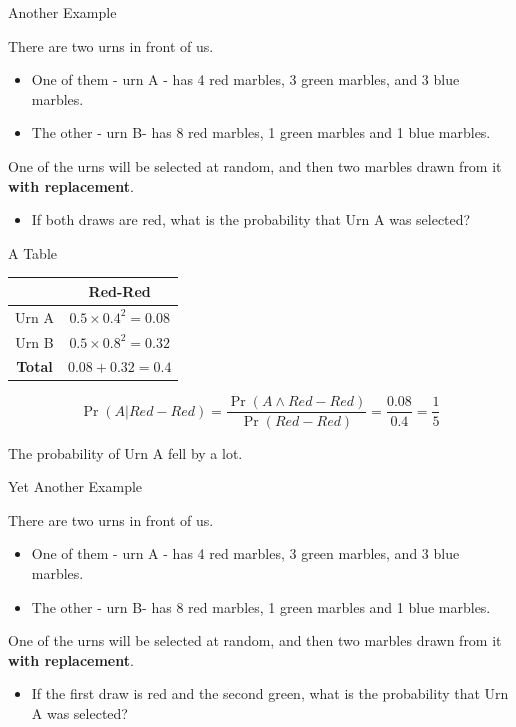\documentclass[
  ignorenonframetext,
]{beamer}
\providecommand{\tightlist}{%
  \setlength{\itemsep}{0pt}\setlength{\parskip}{0pt}}
\renewcommand{\,}{\text{, }}
\begin{document}
\begin{frame}{Another Example}
\protect\hypertarget{another-example-1}{}

There are two urns in front of us.

\begin{itemize}
\tightlist
\item
  One of them - urn A - has 4 red marbles, 3 green marbles, and 3 blue
  marbles.
\item
  The other - urn B- has 8 red marbles, 1 green marbles and 1 blue
  marbles. \pause
\end{itemize}

One of the urns will be selected at random, and then two marbles drawn
from it \textbf{with replacement}.

\begin{itemize}
\tightlist
\item
  If both draws are red, what is the probability that Urn A was
  selected?
\end{itemize}

\end{frame}

\begin{frame}{A Table}
\protect\hypertarget{a-table-1}{}

\begin{longtable}[]{@{}cc@{}}
\toprule
& Red-Red\tabularnewline
\midrule
\endhead
Urn A & \(0.5 \times 0.4^2 = 0.08\)\tabularnewline
Urn B & \(0.5 \times 0.8^2 = 0.32\)\tabularnewline
\textbf{Total} & \(0.08 + 0.32 = 0.4\)\tabularnewline
\bottomrule
\end{longtable}

\pause

\[
\Pr(A | Red-Red) = \frac{\Pr(A \wedge Red-Red)}{\Pr(Red-Red)} = \frac{0.08}{0.4} = \frac{1}{5}
\]

The probability of Urn A fell by a lot.

\end{frame}

\begin{frame}{Yet Another Example}
\protect\hypertarget{yet-another-example}{}

There are two urns in front of us.

\begin{itemize}
\tightlist
\item
  One of them - urn A - has 4 red marbles, 3 green marbles, and 3 blue
  marbles.
\item
  The other - urn B- has 8 red marbles, 1 green marbles and 1 blue
  marbles. \pause
\end{itemize}

One of the urns will be selected at random, and then two marbles drawn
from it \textbf{with replacement}.

\begin{itemize}
\tightlist
\item
  If the first draw is red and the second green, what is the probability
  that Urn A was selected?
\end{itemize}

\end{frame}
\end{document}

